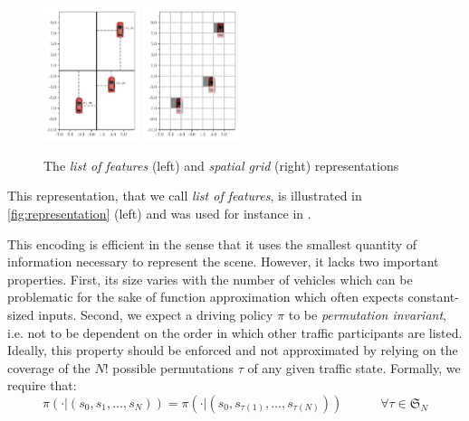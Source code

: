 \begin{figure}[tp]
	\centering
	\includegraphics[width=0.25\textwidth]{img/coordinates}
	\includegraphics[width=0.25\textwidth]{img/map}
	\caption{The \emph{list of features} (left) and \emph{spatial grid} (right) representations}
	\label{fig:representation}
\end{figure}

This representation, that we call \emph{list of features}, is illustrated in \autoref{fig:representation} (left) and was used for instance in \citep{Bai2015, Gindele2015, Song2016, Sunberg2017, Paxton2017, Galceran2017, Chen2017}.


This encoding is efficient in the sense that it uses the smallest quantity of information necessary to represent the scene. However, it lacks two important properties. First, its size varies with the number of vehicles which can be problematic for the sake of function approximation which often expects constant-sized inputs. Second, we expect a driving policy $\pi$ to be \emph{permutation invariant}, i.e. not to be dependent on the order in which other traffic participants are listed. Ideally, this property should be enforced and not approximated by relying on the coverage of the $N!$ possible permutations $\tau$ of any given traffic state. Formally, we require that:
\begin{equation}
\label{eq:permutation}
\pi(\cdot|(s_0, s_1,\dotsc,s_N)) = \pi(\cdot|(s_0, s_{\tau(1)},\dotsc,s_{\tau(N)})) \quad\quad\quad \forall\tau \in \mathfrak{S}_N
\end{equation}

